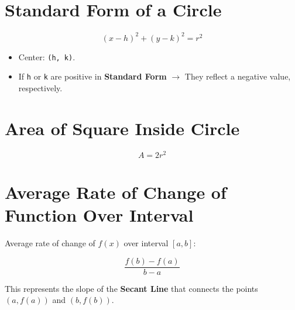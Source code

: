 \documentclass{article}
\begin{document}
\section{Standard Form of a Circle}
\[
  (x - h)^2 + (y - k)^2 = r^2
\]

\begin{itemize}
  \item Center: \texttt{(h, k)}. 
  \item If \texttt{h} or \texttt{k} are positive in \textbf{Standard Form} 
  $\rightarrow$ They reflect a negative value, respectively.
\end{itemize}

\section{Area of Square Inside Circle}
\[
  A = 2r^2
\]

\section{Average Rate of Change of Function Over Interval}
Average rate of change of $f(x)$ over interval $[a, b]$:

\[
  \dfrac{f(b) - f(a)}{b - a}
\]

This represents the slope of the \textbf{Secant Line} that connects the points
$(a, f(a))$ and $(b, f(b))$.
\end{document}
